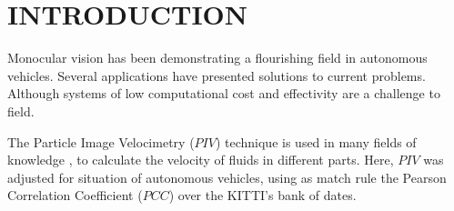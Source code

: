 \section{INTRODUCTION}

Monocular vision has been demonstrating a flourishing field in autonomous vehicles. 
Several applications have presented solutions to current problems. 
Although systems of low computational cost and effectivity are a challenge to field. 


The Particle Image Velocimetry ($PIV$)\cite{Bastiaans} technique is used in many fields of 
knowledge \cite{Story, Xu}, to calculate the velocity of fluids in different parts. 
Here, $PIV$ was adjusted for situation of autonomous vehicles, using as match rule 
the Pearson Correlation Coefficient ($PCC$)\cite{Miranda Neto} over the KITTI's 
bank of dates\cite{Geiger}.


